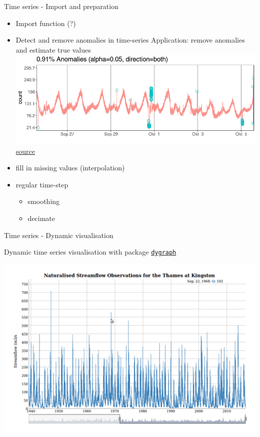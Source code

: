 \documentclass[8pt,ignorenonframetext,]{beamer}
\providecommand{\tightlist}{%
  \setlength{\itemsep}{0pt}\setlength{\parskip}{0pt}}
\begin{document}
\begin{frame}{Time series - Import and preparation}

\begin{itemize}
\tightlist
\item
  Import function (?)
\item
  Detect and remove anomalies in time-series Application: remove
  anomalies and estimate true values
  \includegraphics{imgPres/TS_anomalydetection.png}
  \href{https://github.com/twitter/AnomalyDetection}{source}
\item
  fill in missing values (interpolation)
\item
  regular time-step

  \begin{itemize}
  \tightlist
  \item
    smoothing
  \item
    decimate
  \end{itemize}
\end{itemize}

\end{frame}

\begin{frame}[fragile]{Time series - Dynamic visualisation}

Dynamic time series visualisation with package
\href{https://cran.r-project.org/web/packages/dygraph/index.html}{\texttt{dygraph}}

\includegraphics{imgPres/dygraph.png}

\end{frame}
\end{document}
